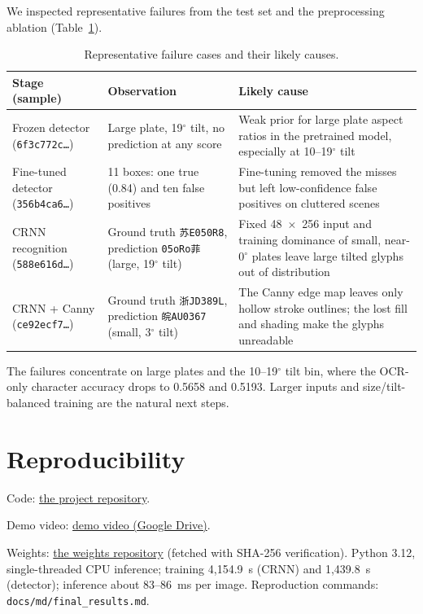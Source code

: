 \documentclass[10pt]{article}
\begin{document}
We inspected representative failures from the test set and the
preprocessing ablation (Table~\ref{tab:failures}).

\begin{table}[H]
\centering
\small
\setlength{\tabcolsep}{4pt}
\setlength{\tabcolsep}{5pt}
\begin{tabular}{@{}p{4.4cm}p{5.2cm}p{5.4cm}@{}}
\toprule
Stage (sample) & Observation & Likely cause \\
\midrule
Frozen detector (\texttt{6f3c772c\ldots}) & Large plate, 19$^{\circ}$
tilt, no prediction at any score & Weak prior for large plate aspect
ratios in the pretrained model, especially at 10--19$^{\circ}$ tilt \\
Fine-tuned detector (\texttt{356b4ca6\ldots}) & 11 boxes: one true (0.84)
and ten false positives & Fine-tuning removed the misses but left
low-confidence false positives on cluttered scenes \\
CRNN recognition (\texttt{588e616d\ldots}) & Ground truth
\texttt{苏E050R8}, prediction \texttt{05oRo菲} (large, 19$^{\circ}$ tilt) &
Fixed 48~$\times$~256 input and training dominance of small, near-0$^{\circ}$
plates leave large tilted glyphs out of distribution \\
CRNN + Canny (\texttt{ce92ecf7\ldots}) & Ground truth \texttt{浙JD389L},
prediction \texttt{皖AU0367} (small, 3$^{\circ}$ tilt) & The Canny edge map
leaves only hollow stroke outlines; the lost fill and shading make the
glyphs unreadable \\
\bottomrule
\end{tabular}
\caption{Representative failure cases and their likely causes.}
\label{tab:failures}
\end{table}

The failures concentrate on large plates and the 10--19$^{\circ}$ tilt
bin, where the OCR-only character accuracy drops to 0.5658 and 0.5193.
Larger inputs and size/tilt-balanced training are the natural next
steps.

\section{Reproducibility}

Code: \href{https://github.com/S1norin/inno-detecting-license-plates}{the project repository}.

Demo video: \href{https://drive.google.com/file/d/1KBiiD-dvhvzsI7yWwDc7KqwM6jp585ez/view}{demo video (Google Drive)}.

Weights: \href{https://huggingface.co/Sinorin/inno-detecting-license-plates-weights}{the weights repository}
(fetched with SHA-256 verification). Python 3.12, single-threaded CPU
inference; training 4{,}154.9~s (CRNN) and 1{,}439.8~s (detector);
inference about 83--86~ms per image. Reproduction commands:
\texttt{docs/md/final\_results.md}.
\end{document}
